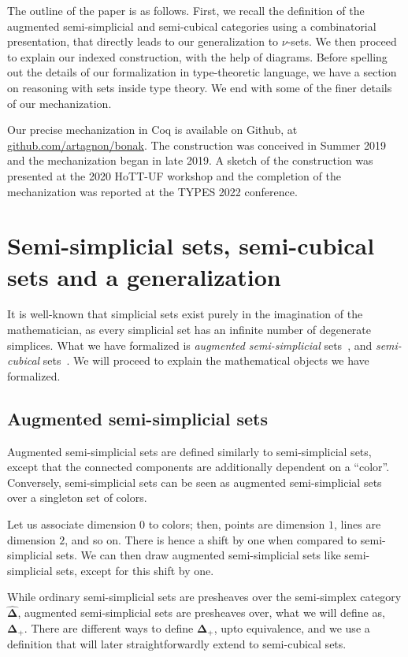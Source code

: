 \documentclass[10pt]{art.cls/art}
\newcommand{\DeltaHat}{\ensuremath{\hat{\boldsymbol{\Delta}}}}
\newcommand{\DeltaPlus}{\ensuremath{\boldsymbol{\Delta}_+}}
\begin{document}
The outline of the paper is as follows. First, we recall the definition of the augmented semi-simplicial and semi-cubical categories using a combinatorial presentation, that directly leads to our generalization to $\nu$-sets. We then proceed to explain our indexed construction, with the help of diagrams. Before spelling out the details of our formalization in type-theoretic language, we have a section on reasoning with sets inside type theory. We end with some of the finer details of our mechanization.

Our precise mechanization in Coq is available on Github, at \href{https://github.com/artagnon/bonak}{github.com/artagnon/bonak}. The construction was conceived in Summer 2019 and the mechanization began in late 2019. A sketch of the construction was presented at the 2020 HoTT-UF workshop and the completion of the mechanization was reported at the TYPES 2022 conference.

\section{Semi-simplicial sets, semi-cubical sets and a generalization}
It is well-known that simplicial sets exist purely in the imagination of the mathematician, as every simplicial set has an infinite number of degenerate simplices. What we have formalized is \emph{augmented semi-simplicial} sets~\cite{fri08}, and \emph{semi-cubical} sets~\cite{grandis03,buchholtz17}. We will proceed to explain the mathematical objects we have formalized.

\subsection{Augmented semi-simplicial sets}
Augmented semi-simplicial sets are defined similarly to semi-simplicial sets, except that the connected components are additionally dependent on a ``color''. Conversely, semi-simplicial sets can be seen as augmented semi-simplicial sets over a singleton set of colors.

Let us associate dimension $0$ to colors; then, points are dimension $1$, lines are dimension $2$, and so on. There is hence a shift by one when compared to semi-simplicial sets. We can then draw augmented semi-simplicial sets like semi-simplicial sets, except for this shift by one.

While ordinary semi-simplicial sets are presheaves over the semi-simplex category \DeltaHat, augmented semi-simplicial sets are presheaves over, what we will define as, \DeltaPlus. There are different ways to define \DeltaPlus, upto equivalence, and we use a definition that will later straightforwardly extend to semi-cubical sets.
\end{document}
